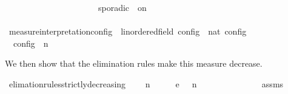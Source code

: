 \begin{isabellebody}
\ \ \ \ \ \ \ \ \ \ \ \ \ \ \ \ \ \ \ \ {\isacharbar}\ {\isacharunderscore}\ sporadic{\isasymsharp}\ {\isacharunderscore}\ on\ {\isacharunderscore}\ {\isasymRightarrow}\ {}\ {\isacharplus}\ {\isasymmu}\ {\isasymPhi}\isanewline
\ \ \ \ \ \ \ \ \ \ \ \ \ \ \ \ \ \ \ \ {\isacharbar}\ {\isacharunderscore}\ \ \ \ \ \ \ \ \ \ \ \ \ \ \ \ \ {\isasymRightarrow}\ {}\ {\isacharplus}\ {\isasymmu}\ {\isasymPhi}{\isacharparenright}{\isacartoucheclose}\isanewline
\isanewline
{}\isamarkupfalse%
\ measure{\isacharunderscore}interpretation{\isacharunderscore}config\ {\isacharcolon}{\isacharcolon}\ {\isacartoucheopen}{\isacharprime}{\isasymtau}{\isacharcolon}{\isacharcolon}linordered{\isacharunderscore}field\ config\ {\isasymRightarrow}\ nat{\isacartoucheclose}\ {\isacharparenleft}{\isacartoucheopen}{\isasymmu}\isactrlsub c\isactrlsub o\isactrlsub n\isactrlsub f\isactrlsub i\isactrlsub g{\isacartoucheclose}{\isacharparenright}\isanewline
{}\isanewline
\ \ {\isacartoucheopen}{\isasymmu}\isactrlsub c\isactrlsub o\isactrlsub n\isactrlsub f\isactrlsub i\isactrlsub g\ {\isacharparenleft}{\isasymGamma}{\isacharcomma}\ n\ {\isasymturnstile}\ {\isasymPsi}\ {\isasymtriangleright}\ {\isasymPhi}{\isacharparenright}\ {\isacharequal}\ {\isasymmu}\ {\isasymPsi}{\isacartoucheclose}%
\begin{isamarkuptext}%
We then show that the elimination rules make this measure decrease.%
\end{isamarkuptext}\isamarkuptrue%
\isamarkupfalse%
\ elimation{\isacharunderscore}rules{\isacharunderscore}strictly{\isacharunderscore}decreasing{\isacharcolon}\isanewline
\ \ \ {\isacartoucheopen}{\isacharparenleft}{\isasymGamma}\ n\ {\isasymturnstile}\ {\isasymPsi}\ {\isasymtriangleright}\ {\isasymPhi}\ \ {\isasymhookrightarrow}\isactrlsub e\ \ {\isacharparenleft}{\isasymGamma}\ n\ {\isasymturnstile}\ {\isasymPsi}\ {\isasymtriangleright}\ {\isasymPhi}\isanewline
\ \ \ \ \ {\isacartoucheopen}{\isasymmu}\ {\isasymPsi}\ {\isachargreater}\ {\isasymmu}\ {\isasymPsi}\isanewline
%
\isadelimproof
%
\endisadelimproof
%
\isatagproof
{}\isamarkupfalse%
\ assms\ \isamarkupfalse%

\end{isabellebody}
